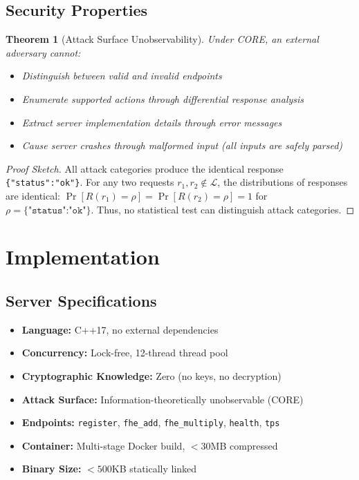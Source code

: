 \documentclass{article}
\newtheorem{theorem}{Theorem}[section]
\begin{document}
\subsection{Security Properties}

\begin{theorem}[Attack Surface Unobservability]
Under CORE, an external adversary cannot:
\begin{itemize}
    \item Distinguish between valid and invalid endpoints
    \item Enumerate supported actions through differential response analysis
    \item Extract server implementation details through error messages
    \item Cause server crashes through malformed input (all inputs are safely parsed)
\end{itemize}
\end{theorem}

\begin{proof}[Proof Sketch]
All attack categories produce the identical response \texttt{\{"status":"ok"\}}. For any two requests $r_1, r_2 \notin \mathcal{L}$, the distributions of responses are identical: $\Pr[R(r_1) = \rho] = \Pr[R(r_2) = \rho] = 1$ for $\rho = \texttt{\{"status":"ok"\}}$. Thus, no statistical test can distinguish attack categories.
\end{proof}

\section{Implementation}

\subsection{Server Specifications}

\begin{itemize}
    \item \textbf{Language:} C++17, no external dependencies
    \item \textbf{Concurrency:} Lock-free, 12-thread thread pool
    \item \textbf{Cryptographic Knowledge:} Zero (no keys, no decryption)
    \item \textbf{Attack Surface:} Information-theoretically unobservable (CORE)
    \item \textbf{Endpoints:} \texttt{register}, \texttt{fhe\_add}, \texttt{fhe\_multiply}, \texttt{health}, \texttt{tps}
    \item \textbf{Container:} Multi-stage Docker build, $<30$MB compressed
    \item \textbf{Binary Size:} $<500$KB statically linked
\end{itemize}
\end{document}
